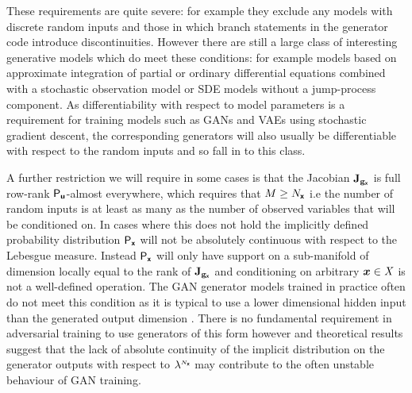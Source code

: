 These requirements are quite severe: for example they exclude any models with discrete random inputs and those in which branch statements in the generator code introduce discontinuities. However there are still a large class of interesting generative models which do meet these conditions: for example models based on approximate integration of partial or ordinary differential equations combined with a stochastic observation model or \ac{SDE} models without a jump-process component. As differentiability with respect to model parameters is a requirement for training models such as \acp{GAN} and \acp{VAE} using stochastic gradient descent, the corresponding generators will also usually be differentiable with respect to the random inputs and so fall in to this class.

A further restriction we will require in some cases is that the Jacobian $\mathbf{J}_{{\mathbf{g}}_{\boldsymbol{\mathsf{x}}}}$ is full row-rank $\mathsf{P}_{\boldsymbol{\mathsf{u}}}$-almost everywhere, which requires that $M \geq N_{\boldsymbol{\mathsf{x}}}$ i.e the number of random inputs is at least as many as the number of observed variables that will be conditioned on. In cases where this does not hold the implicitly defined probability distribution $\mathsf{P}_{\boldsymbol{\mathsf{x}}}$ will not be absolutely continuous with respect to the Lebesgue measure. Instead $\mathsf{P}_{\boldsymbol{\mathsf{x}}}$ will only have support on a sub-manifold of dimension locally equal to the rank of $\mathbf{J}_{{\mathbf{g}}_{\boldsymbol{\mathsf{x}}}}$ and conditioning on arbitrary $\boldsymbol{x} \in \mathit{X}$ is not a well-defined operation. The \ac{GAN} generator models trained in practice often do not meet this condition as it is typical to use a lower dimensional hidden input than the generated output dimension \citep{arjovsky2017towards}. There is no fundamental requirement in adversarial training to use generators of this form however and theoretical results \citep{arjovsky2017towards} suggest that the lack of absolute continuity of the implicit distribution on the generator outputs with respect to $\lebm{N_{\rvct{x}}}$ may contribute to the often unstable behaviour of \ac{GAN} training.

